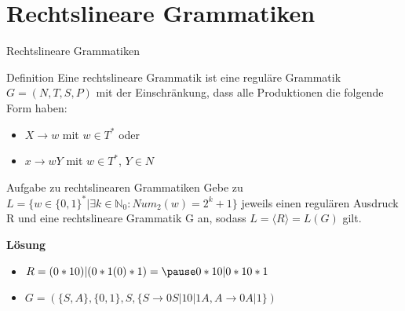 \documentclass{beamer}
\begin{document}
\section{Rechtslineare Grammatiken}
\begin{frame}{Rechtslineare Grammatiken}
\begin{block}{Definition}
Eine rechtslineare Grammatik ist eine reguläre Grammatik $G=(N,T,S,P)$ mit der Einschränkung, dass alle Produktionen die folgende Form haben:
\begin{itemize}
\item $X \rightarrow w$ mit $w \in T^*$ oder
\item $x\rightarrow wY$ mit $w \in T^*$, $Y \in N$
\end{itemize}
\end{block}
\end{frame}

\begin{frame}
\begin{taskblock}{Aufgabe zu rechtslinearen Grammatiken}
Gebe zu $L = \{ w \in \{ 0,1 \}^* | \exists k \in \mathbb{N}_0: Num_2(w) = 2^k + 1 \}$ jeweils einen regulären Ausdruck R und eine rechtslineare Grammatik G an, sodass $L = \langle R \rangle = L(G)$ gilt.
\end{taskblock}
\pause
\textbf{Lösung}\\		
\begin{itemize}
\item $R = (0*10)|(0*1(0)* 1) = \pause 0*10|0*10* 1 $ \pause
\item $G = (\{S,A\}, \{0,1\}, S, \{S \rightarrow0S|10|1A, A \rightarrow 0A|1\})$
\end{itemize}
\end{frame}

\end{document}
